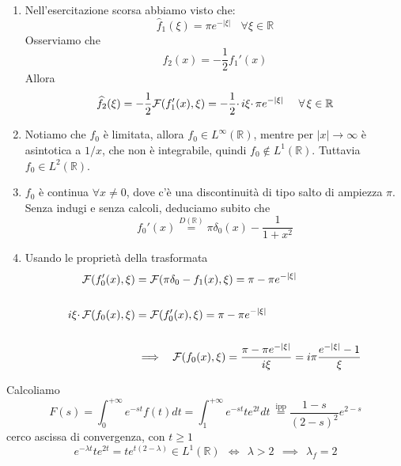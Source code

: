 \begin{enumerate}
\item Nell'esercitazione scorsa abbiamo visto che:\begin{equation*}
\hat{f}_{1}( \xi ) =\pi e^{-| \xi | } \ \ \ \ \forall \xi \in \mathbb{R}
\end{equation*}Osserviamo che\begin{equation*}
f_{2}( x) =-\frac{1}{2} f_{1} '( x)
\end{equation*}Allora\begin{equation*}
\hat{f}_{2}( \xi ) =-\frac{1}{2}\Fc ( f_{1} '( x) ,\xi ) =-\frac{1}{2} \cdotp i\xi \cdotp \pi e^{-| \xi | } \ \ \ \ \forall \xi \in \mathbb{R}
\end{equation*}
\item Notiamo che $f_{0}$ è limitata, allora $f_{0} \in L^{\infty }(\mathbb{R})$, mentre per $| x| \rightarrow \infty $ è asintotica a $1/x$, che non è integrabile, quindi $f_{0} \notin L^{1}(\mathbb{R})$. Tuttavia $f_{0} \in L^{2}(\mathbb{R})$.
\item $f_{0}$ è continua $\forall x\neq 0$, dove c'è una discontinuità di tipo salto di ampiezza $\pi $. Senza indugi e senza calcoli, deduciamo subito che\begin{equation*}
f_{0} '( x)\overset{D(\mathbb{R})}{=} \pi \delta _{0}( x) -\frac{1}{1+x^{2}}
\end{equation*}
\item Usando le proprietà della trasformata\begin{align*}
\mathcal{F} ( f_{0} '( x) ,\xi ) & =\mathcal{F} ( \pi \delta _{0} -f_{1}( x) ,\xi ) =\pi -\pi e^{-| \xi | }\\
 & \\
i\xi \cdotp\mathcal{F} ( f_{0}( x) ,\xi ) & =\mathcal{F} ( f_{0} '( x) ,\xi ) =\pi -\pi e^{-| \xi | }\\
 & \\
 & \implies \ \ \mathcal{F} ( f_{0}( x) ,\xi ) =\frac{\pi -\pi e^{-| \xi | }}{i\xi } =i\pi \frac{e^{-| \xi | } -1}{\xi }
\end{align*}
\end{enumerate}
\Soluzione

Calcoliamo
\begin{equation*}
F( s) =\int ^{+\infty }_{0} e^{-st} f( t) dt=\int ^{+\infty }_{1} e^{-st} te^{2t} dt\ \overset{\text{ipp}}{=}\frac{1-s}{( 2-s)^{2}} e^{2-s}
\end{equation*}
cerco ascissa di convergenza, con $t\geqslant 1$
\begin{equation*}
e^{-\lambda t} te^{2t} =te^{t( 2-\lambda )} \in L^{1}(\mathbb{R}) \ \ \iff \ \ \lambda  >2\ \ \implies \ \ \lambda _{f} =2
\end{equation*}
\Soluzione

